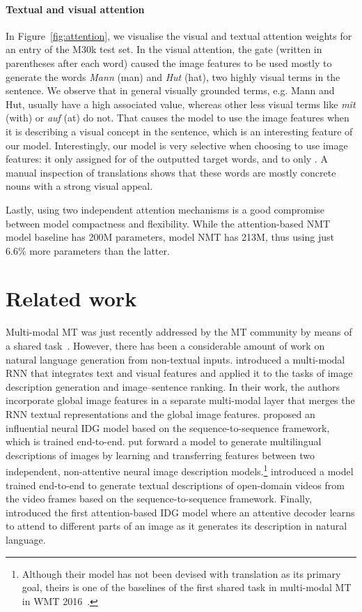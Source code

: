 \documentclass[11pt]{article}
\begin{document}
\paragraph{Textual and visual attention}

In Figure~\ref{fig:attention}, we visualise the visual and textual attention weights for an entry of the M30k test set.
In the visual attention, the  gate (written in parentheses after each word) caused the image features to be used mostly to generate the words \emph{Mann} (man) and \emph{Hut} (hat), two highly visual terms in the sentence.
We observe that in general visually grounded terms, e.g. Mann and Hut, usually have a high associated  value, whereas other less visual terms like \emph{mit} (with) or \emph{auf} (at) do not.
That causes the model to use the image features when it is describing a visual concept in the sentence, which is an interesting feature of our model.
Interestingly, our model is very selective when choosing to use image features: it only assigned  for  of the outputted target words, and  to only .
A manual inspection of translations shows that these words are mostly concrete nouns with a strong visual appeal.

Lastly, using two independent attention mechanisms is a good compromise between model compactness and flexibility.
While the attention-based NMT model baseline has 200M parameters,
model NMT has 213M,
thus using just 6.6\% more parameters than the latter.


\section{Related work}
\label{sec:related}

Multi-modal MT was just recently addressed by the MT community by means of a shared task~\cite{Speciaetal2016}.
However, there has been a considerable amount of work on natural language generation from non-textual inputs.
 introduced a multi-modal RNN that integrates text and visual features and applied it to the tasks of image description generation and image--sentence ranking.
In their work, the authors incorporate global image features in a separate multi-modal layer that merges the RNN textual representations and the global image features.
 proposed an influential neural IDG model based on the sequence-to-sequence framework, which is trained end-to-end.
 put forward a model to generate multilingual descriptions of images by learning and transferring features between two independent, non-attentive neural image description models.\footnote{Although their model has not been devised with translation as its primary goal, theirs is one of the baselines of the first shared task in multi-modal MT in WMT 2016~\cite{Speciaetal2016}.}
 introduced a model trained end-to-end to generate textual descriptions of open-domain videos from the video frames based on the sequence-to-sequence framework.
Finally,  introduced the first attention-based IDG model where an attentive decoder learns to attend to different parts of an image as it generates its description in natural language.
\end{document}
